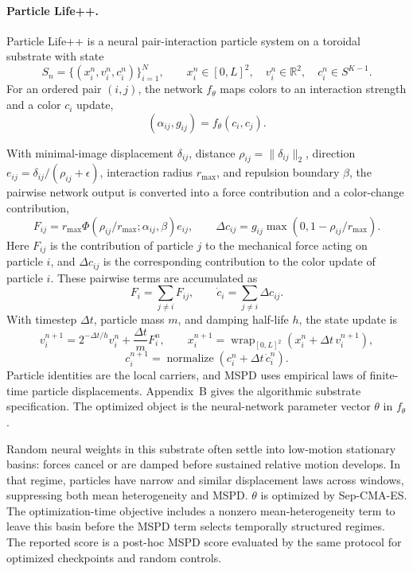 \paragraph{Particle Life++.}
Particle Life++ is a neural pair-interaction particle system on a toroidal substrate with state
\[
  S_n=\{(x_i^n,v_i^n,c_i^n)\}_{i=1}^{N},
  \qquad x_i^n\in[0,L]^2,
  \quad v_i^n\in\mathbb R^2,
  \quad c_i^n\in S^{K-1}.
\]
For an ordered pair $(i,j)$, the network $f_\theta$ maps colors to an interaction strength and a color $c_i$ update,
\[
  (\alpha_{ij},g_{ij})=f_\theta(c_i,c_j).
\]

With minimal-image displacement $\delta_{ij}$, distance $\rho_{ij}=\|\delta_{ij}\|_2$, direction $e_{ij}=\delta_{ij}/(\rho_{ij}+\epsilon)$, interaction radius $r_{\max}$, and repulsion boundary $\beta$, the pairwise network output is converted into a force contribution and a color-change contribution,
\[
  F_{ij}=r_{\max}\Phi(\rho_{ij}/r_{\max};\alpha_{ij},\beta)e_{ij},
  \qquad
  \Delta c_{ij}=g_{ij}\max(0,1-\rho_{ij}/r_{\max}).
\]
Here $F_{ij}$ is the contribution of particle $j$ to the mechanical force acting on particle $i$, and $\Delta c_{ij}$ is the corresponding contribution to the color update of particle $i$.  These pairwise terms are accumulated as
\[
  F_i=\sum_{j\ne i}F_{ij},
  \qquad
  \dot c_i=\sum_{j\ne i}\Delta c_{ij}.
\]
With timestep $\Delta t$, particle mass $m$, and damping half-life $h$, the state update is
\[
  v_i^{n+1}=2^{-\Delta t/h}v_i^n+\frac{\Delta t}{m}F_i^n,
  \qquad
  x_i^{n+1}=\operatorname{wrap}_{[0,L]^2}\!\left(x_i^n+\Delta t\,v_i^{n+1}\right),
\]
\[
  c_i^{n+1}=
  \operatorname{normalize}\!\left(c_i^n+\Delta t\,\dot c_i^n\right).
\]
Particle identities are the local carriers, and MSPD uses empirical laws of finite-time particle displacements. Appendix~B gives the algorithmic substrate specification.  The optimized object is the neural-network parameter vector $\theta$ in $f_\theta$.

Random neural weights in this substrate often settle into low-motion stationary basins: forces cancel or are damped before sustained relative motion develops.  In that regime, particles have narrow and similar displacement laws across windows, suppressing both mean heterogeneity and MSPD. $\theta$ is optimized by Sep-CMA-ES.  The optimization-time objective includes a nonzero mean-heterogeneity term to leave this basin before the MSPD term selects temporally structured regimes. The reported score is a post-hoc MSPD score evaluated by the same protocol for optimized checkpoints and random controls.

